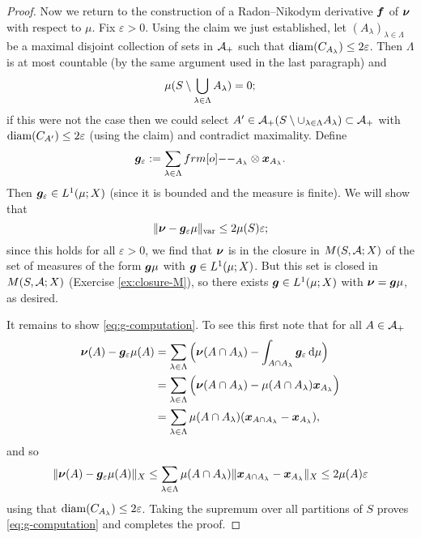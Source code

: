 \begin{proof}
  Now we return to the construction of a Radon--Nikodym derivative $\bm{f}$ of $\bm{\nu}$ with respect to $\mu$.
  Fix $\varepsilon > 0$.
  Using the claim we just established, let $(A_{\lambda})_{\lambda \in \Lambda}$ be a maximal disjoint collection of sets in $\mathcal{A}_+$ such that $\operatorname{diam}(C_{A_{\lambda}}) \leq 2\varepsilon$.
  Then $\Lambda$ is at most countable (by the same argument used in the last paragraph) and
  \begin{equation*}
    \mu(S \setminus \bigcup_{\lambda \in \Lambda} A_{\lambda}) = 0;
  \end{equation*}
  if this were not the case then we could select $A' \in \mathcal{A}_+(S \setminus \cup_{\lambda \in \Lambda} A_{\lambda}) \subset \mathcal{A}_+$ with $\operatorname{diam}(C_{A'}) \leq 2\varepsilon$ (using the claim) and contradict maximality.
  Define
  \begin{equation*}
    \mb{g}_{\varepsilon} := \sum_{\lambda \in \Lambda} \1_{A_{\lambda}} \otimes \mb{x}_{A_{\lambda}}.
  \end{equation*}
  Then $\bm{g}_{\varepsilon} \in L^1(\mu;X)$ (since it is bounded and the measure is finite).
  We will show that
  \begin{equation}\label{eq:g-computation}
    \|\bm{\nu} - \bm{g}_{\varepsilon}\mu\|_{\mathrm{var}} \leq 2\mu(S)\varepsilon;
  \end{equation}
  since this holds for all $\varepsilon > 0$, we find that $\bm{\nu}$ is in the closure in $M(S,\mathcal{A};X)$ of the set of measures of the form $\bm{g}\mu$ with $\bm{g} \in L^1(\mu;X)$.
  But this set is closed in $M(S,\mathcal{A};X)$ (Exercise \ref{ex:closure-M}), so there exists $\bm{g} \in L^1(\mu;X)$ with $\bm{\nu} = \bm{g}\mu$, as desired.

  It remains to show \eqref{eq:g-computation}.
  To see this first note that for all $A \in \mathcal{A}_+$
  \begin{equation*}
    \begin{aligned}
      \bm{\nu}(A) - \bm{g}_\varepsilon\mu(A)
      &= \sum_{\lambda \in \Lambda} \Big(  \bm{\nu}(A \cap A_{\lambda}) - \int_{A \cap A_{\lambda}} \bm{g}_{\varepsilon} \, \mathrm{d}\mu \Big) \\
      &= \sum_{\lambda \in \Lambda} \Big(  \bm{\nu}(A \cap A_{\lambda}) - \mu(A \cap A_{\lambda}) \bm{x}_{A_{\lambda}} \Big) \\
      &= \sum_{\lambda \in \Lambda} \mu(A \cap A_{\lambda})(\bm{x}_{A \cap A_{\lambda}} - \bm{x}_{A_{\lambda}}),
    \end{aligned}
  \end{equation*}
  and so
  \begin{equation*}
    \|\bm{\nu}(A) - \bm{g}_\varepsilon\mu(A)\|_{X}
    \leq \sum_{\lambda \in \Lambda} \mu(A \cap A_{\lambda}) \|\bm{x}_{A \cap A_{\lambda}} - \bm{x}_{A_{\lambda}}\|_{X} \leq 2\mu(A)\varepsilon
  \end{equation*}
  using that $\operatorname{diam}(C_{A_{\lambda}}) \leq 2\varepsilon$.
  Taking the supremum over all partitions of $S$ proves \eqref{eq:g-computation} and completes the proof.
\end{proof}

